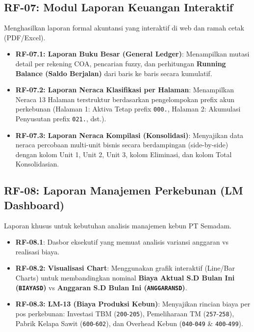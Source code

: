 \documentclass[11pt,a4paper]{article}
\begin{document}
\subsection{RF-07: Modul Laporan Keuangan Interaktif}
Menghasilkan laporan formal akuntansi yang interaktif di web dan ramah cetak (PDF/Excel).
\begin{itemize}
    \item \textbf{RF-07.1: Laporan Buku Besar (General Ledger)}: Menampilkan mutasi detail per rekening COA, pencarian fuzzy, dan perhitungan \textbf{Running Balance (Saldo Berjalan)} dari baris ke baris secara kumulatif.
    \item \textbf{RF-07.2: Laporan Neraca Klasifikasi per Halaman}: Menampilkan Neraca 13 Halaman terstruktur berdasarkan pengelompokan prefix akun perkebunan (Halaman 1: Aktiva Tetap prefix \texttt{000.}, Halaman 2: Akumulasi Penyusutan prefix \texttt{021.}, dst.).
    \item \textbf{RF-07.3: Laporan Neraca Kompilasi (Konsolidasi)}: Menyajikan data neraca percobaan multi-unit bisnis secara berdampingan (side-by-side) dengan kolom Unit 1, Unit 2, Unit 3, kolom Eliminasi, dan kolom Total Konsolidasian.
\end{itemize}

\subsection{RF-08: Laporan Manajemen Perkebunan (LM Dashboard)}
Laporan khusus untuk kebutuhan analisis manajemen kebun PT Semadam.
\begin{itemize}
    \item \textbf{RF-08.1}: Dasbor eksekutif yang memuat analisis variansi anggaran vs realisasi biaya.
    \item \textbf{RF-08.2: Visualisasi Chart}: Menggunakan grafik interaktif (Line/Bar Charts) untuk membandingkan nominal \textbf{Biaya Aktual S.D Bulan Ini (\texttt{BIAYASD})} vs \textbf{Anggaran S.D Bulan Ini (\texttt{ANGGARANSD})}.
    \item \textbf{RF-08.3: LM-13 (Biaya Produksi Kebun)}: Menyajikan rincian biaya per pos perkebunan: Investasi TBM (\texttt{200}-\texttt{205}), Pemeliharaan TM (\texttt{257}-\texttt{258}), Pabrik Kelapa Sawit (\texttt{600}-\texttt{602}), dan Overhead Kebun (\texttt{040}-\texttt{049} \& \texttt{400}-\texttt{499}).
\end{itemize}
\end{document}
